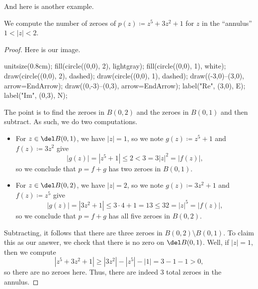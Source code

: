 \documentclass[../notes.tex]{subfiles}
\begin{document}
And here is another example.
\begin{exe}
	We compute the number of zeroes of $p(z)\coloneqq z^5+3z^2+1$ for $z$ in the ``annulus'' $1<|z|<2$.
\end{exe}
\begin{proof}
	Here is our image.
	\begin{center}
		\begin{asy}
			unitsize(0.8cm);
			fill(circle((0,0), 2), lightgray);
			fill(circle((0,0), 1), white);
			draw(circle((0,0), 2), dashed);
			draw(circle((0,0), 1), dashed);
			draw((-3,0)--(3,0), arrow=EndArrow);
			draw((0,-3)--(0,3), arrow=EndArrow);
			label("$\textrm{Re}$", (3,0), E);
			label("$\textrm{Im}$", (0,3), N);
		\end{asy}
	\end{center}
	The point is to find the zeroes in $B(0,2)$ and the zeroes in $B(0,1)$ and then subtract. As such, we do two computations.
	\begin{itemize}
		\item For $z\in\del B(0,1)$, we have $|z|=1$, so we note $g(z)\coloneqq z^5+1$ and $f(z)\coloneqq 3z^2$ give
		\[|g(z)|=\left|z^5+1\right|\le2<3=3|z|^2=|f(z)|,\]
		so we conclude that $p=f+g$ has two zeroes in $B(0,1)$.
		\item For $z\in\del B(0,2)$, we have $|z|=2$, so we note $g(z)\coloneqq 3z^2+1$ and $f(z)\coloneqq z^5$ give
		\[|g(z)|=\left|3z^2+1\right|\le3\cdot4+1=13\le32=|z|^5=|f(z)|,\]
		so we conclude that $p=f+g$ has all five zeroes in $B(0,2)$.
	\end{itemize}
	Subtracting, it follows that there are three zeroes in $B(0,2)\setminus B(0,1)$. To claim this as our answer, we check that there is no zero on $\del B(0,1)$. Well, if $|z|=1$, then we compute
	\[\left|z^5+3z^2+1\right|\ge\left|3z^2\right|-\left|z^5\right|-|1|=3-1-1>0,\]
	so there are no zeroes here. Thus, there are indeed $\boxed3$ total zeroes in the annulus.
\end{proof}
\end{document}
